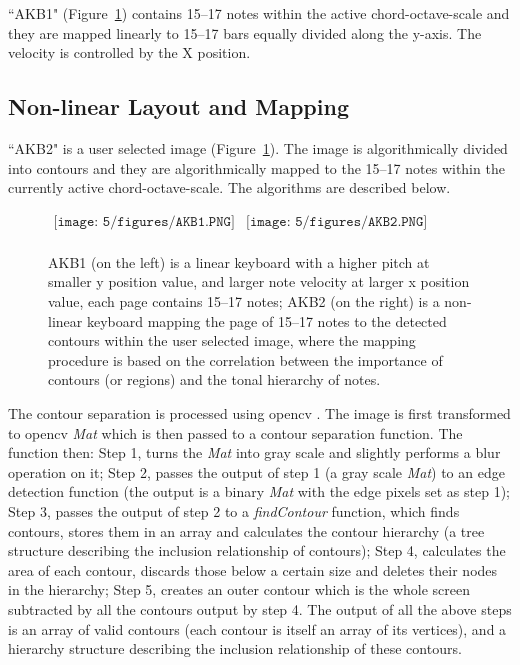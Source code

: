 ``AKB1" (Figure~\ref{fig:5-AKB12}) contains 15--17 notes within the active chord-octave-scale and they are mapped linearly to 15--17
bars equally divided along the y-axis. The velocity is controlled by the X position.

\subsection{Non-linear Layout and Mapping}
``AKB2" is a user selected image (Figure~\ref{fig:5-AKB12}). The image is algorithmically divided into contours and they are algorithmically mapped to the 15--17 notes within the currently active chord-octave-scale. The algorithms are described below.
\begin{figure}[htbp]
\begin{center}$
\begin{array}{cc}
\texttt{[image: 5/figures/AKB1.PNG]} &
\texttt{[image: 5/figures/AKB2.PNG]} \\
\end{array}$
\end{center}
\caption{AKB1 (on the left) is a linear keyboard with a higher pitch at smaller y position value, and larger note velocity at larger x position value, each page contains 15--17 notes; AKB2 (on the right) is a non-linear keyboard mapping the page of 15--17 notes to the detected contours within the user selected image, where the mapping procedure is based on the correlation between the importance of contours (or regions) and the tonal hierarchy of notes.}
\label{fig:5-AKB12}
\end{figure}

The contour separation is processed using opencv \cite{opencv}. The image is first transformed to opencv \textit{Mat} which is then passed to a contour separation function. The function then: Step 1, turns the \textit{Mat} into gray scale and slightly performs a blur operation on it; Step 2, passes the output of step 1 (a gray scale \textit{Mat}) to an edge detection function (the output is a binary \textit{Mat} with the edge pixels set as step 1); Step 3, passes the output of step 2 to a \textit{findContour} function, which finds contours, stores them in an array and calculates the contour hierarchy (a tree structure describing the inclusion relationship of contours); Step 4, calculates the area of each contour, discards those below a certain size and deletes their nodes in the hierarchy; Step 5, creates an outer contour which is the whole screen subtracted by all the contours output by step 4. The output of all the above steps is an array of valid contours (each contour is itself an array of its vertices), and a hierarchy structure describing the inclusion relationship of these contours.

